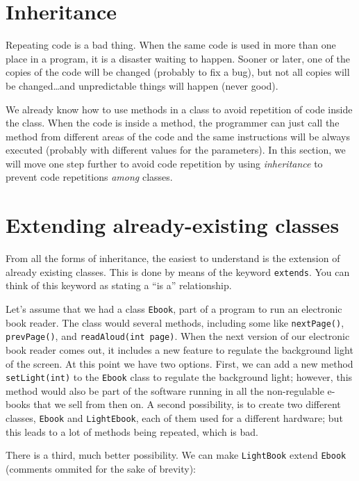 \section{Inheritance}
\label{sec:inheritance-1}

Repeating code is a bad thing. When the same code is used in more than
one place in a program, it is a disaster waiting to happen. Sooner or
later, one of the copies of the code will be changed (probably to fix
a bug), but not all copies will be changed\ldots and unpredictable things
will happen (never good). 

We already know how to use methods in a class to avoid repetition of
code inside the class. When the code is inside a method, the
programmer can just call the method from different areas of the code
and the same instructions will be always executed (probably with
different values for the parameters). In this section, we will move
one step further to avoid code repetition by using \emph{inheritance} to
prevent code repetitions \emph{among} classes. 

\section{Extending already-existing classes}
\label{sec:extend-alre-exist}

From all the forms of inheritance, the easiest to understand is the
extension of already existing classes. This is done by means of the
keyword \verb+extends+. You can think of this keyword as stating a
``is a'' relationship. 

Let's assume that we had a class \verb+Ebook+,
part of a program to run an electronic book reader. The class would
several methods, including some like \verb+nextPage()+,
\verb+prevPage()+, and \verb+readAloud(int page)+. When the next
version of our electronic book reader comes out, it includes a new
feature to regulate the background light of the screen. At this point
we have two options. First, we can add a new method
\verb+setLight(int)+ to the \verb+Ebook+ class to regulate the
background light; however, this method would also be part of the
software running in all the non-regulable e-books that we sell from
then on. A second possibility, is to create two different classes,
\verb+Ebook+ and \verb+LightEbook+, each of them used for a different
hardware; but this leads to a lot of methods being repeated, which is
bad. 

There is a third, much better possibility. We can make
\verb+LightBook+ extend \verb+Ebook+ (comments ommited for the sake of
brevity): 

